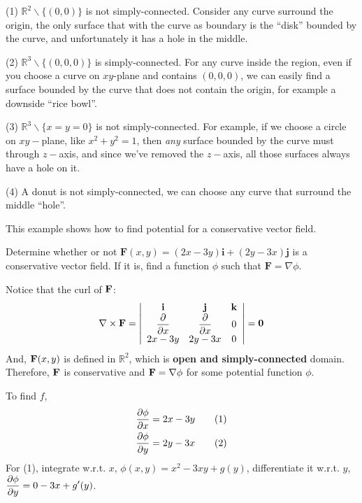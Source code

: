 \begin{spacing}{1.3}
    (1) $\mathbb{R}^2\backslash \{(0,0)\}$ is not simply-connected. Consider any curve surround the origin,
    the only surface that with the curve as boundary is the ``disk'' bounded by the curve, and unfortunately 
    it has a hole in the middle.

    (2) $\mathbb{R}^3\backslash \{(0,0,0)\}$ is simply-connected. For any curve inside the region, even if 
    you choose a curve on $xy$-plane and contains $(0,0,0)$, we can easily find a surface bounded by the 
    curve that does not contain the origin, for example a downside ``rice bowl''.

    (3) $\mathbb{R}^3\backslash \{x=y=0\}$ is not simply-connected. For example, if we choose a circle on 
    $xy-$plane, like $x^2+y^2=1$, then {\it any} surface bounded by the curve must through $z-$axis,
    and since we've removed the $z-$axis, all those surfaces always have a hole on it.

    (4) A donut is not simply-connected, we can choose any curve that surround the middle ``hole''.


    \vspace{0.5in}
    {\blue This example shows how to find potential for a conservative vector field.}

    \eg Determine whether or not $\mathbf{F}(x, y)=(2 x-3 y) \mathbf{i}+(2 y-3 x) \mathbf{j}$ 
    is a conservative vector field. If it is, find a function $\phi$ such that $\mathbf{F}=\nabla \phi$.

    \sol Notice that the curl of ${\bf F}$:
    $$\nabla \times {\bf F}=\left|\begin{array}{ccc}
        {\bf i} & {\bf j} & {\bf k} \\
        \dfrac{\partial}{\partial x} & \dfrac{\partial}{\partial x} & 0\\
        2x-3y & 2y-3x & 0
    \end{array} \right|={\bf 0}$$
    And, ${\bf F}(x,y)$ is defined in $\mathbb{R}^2$, which is {\bf open and simply-connected} domain.
    Therefore, ${\bf F}$ is conservative and ${\bf F}=\nabla \phi$ for some potential function $\phi$.

    To find $f$,
    \begin{align*}
        \frac{\partial \phi}{\partial x} &= 2x-3y\qquad (1)\\
        \frac{\partial \phi}{\partial y} &= 2y-3x\qquad (2)
    \end{align*}
    For (1), integrate w.r.t. $x$, $\phi(x,y)=x^2-3xy+g(y)$, differentiate it w.r.t. $y$,
    $\displaystyle \frac{\partial \phi}{\partial y}=0-3x+g'(y)$.


\end{spacing}
